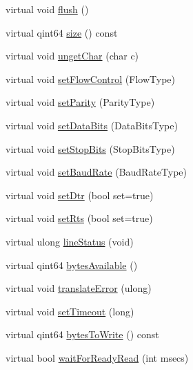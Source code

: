 \begin{DoxyCompactItemize}
\item 
virtual void \mbox{\hyperlink{class_win___qext_serial_port_ac72e737e24bda9c14a9388eac8ef2622}{flush}} ()
\item 
virtual qint64 \mbox{\hyperlink{class_win___qext_serial_port_a96d6dc07286366b2b553b6f6244e406e}{size}} () const
\item 
virtual void \mbox{\hyperlink{class_win___qext_serial_port_a02ce5d55c51cca1862f2154f680d6e3c}{unget\+Char}} (char c)
\item 
virtual void \mbox{\hyperlink{class_win___qext_serial_port_a7660b3b66f45ce087ea14572e753f44d}{set\+Flow\+Control}} (Flow\+Type)
\item 
virtual void \mbox{\hyperlink{class_win___qext_serial_port_abae5c88ee4e09908766febede36a682a}{set\+Parity}} (Parity\+Type)
\item 
virtual void \mbox{\hyperlink{class_win___qext_serial_port_a33168191b03365b429b8413f6286f4c8}{set\+Data\+Bits}} (Data\+Bits\+Type)
\item 
virtual void \mbox{\hyperlink{class_win___qext_serial_port_a67fc083cb06b6b1872fc4360cd599821}{set\+Stop\+Bits}} (Stop\+Bits\+Type)
\item 
virtual void \mbox{\hyperlink{class_win___qext_serial_port_aa5578e4862e3743da2a923f082f821d6}{set\+Baud\+Rate}} (Baud\+Rate\+Type)
\item 
virtual void \mbox{\hyperlink{class_win___qext_serial_port_aa8b9bd3cb0ad482d90cb85e386aaeb77}{set\+Dtr}} (bool set=true)
\item 
virtual void \mbox{\hyperlink{class_win___qext_serial_port_a1186404a1c53db1c473cfb63b682e52c}{set\+Rts}} (bool set=true)
\item 
virtual ulong \mbox{\hyperlink{class_win___qext_serial_port_a5aecf6de25391bb59ad4d18f3562eef3}{line\+Status}} (void)
\item 
virtual qint64 \mbox{\hyperlink{class_win___qext_serial_port_a8c76fa901fd01f97f57addad088c3e2c}{bytes\+Available}} ()
\item 
virtual void \mbox{\hyperlink{class_win___qext_serial_port_abf215448e265ab0bc8d06cb05e0f7778}{translate\+Error}} (ulong)
\item 
virtual void \mbox{\hyperlink{class_win___qext_serial_port_a0044d8db328690aa72ba6c1c07cb66a3}{set\+Timeout}} (long)
\item 
virtual qint64 \mbox{\hyperlink{class_win___qext_serial_port_a0cb24ec851418ebf6be7cd1d407e5592}{bytes\+To\+Write}} () const
\item 
virtual bool \mbox{\hyperlink{class_win___qext_serial_port_aa089a2a66d8d4fa3a3ce4c99c9c7e30f}{wait\+For\+Ready\+Read}} (int msecs)
\end{DoxyCompactItemize}
